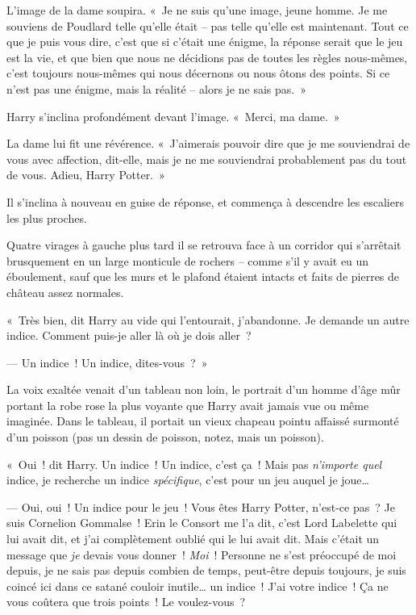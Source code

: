 L'image de la dame soupira.
«~Je ne suis qu'une image, jeune homme.
Je me souviens de Poudlard telle qu'elle était -- pas telle qu'elle est maintenant.
Tout ce que je puis vous dire, c'est que si c'était une énigme, la réponse serait que le jeu est la vie, et que bien que nous ne décidions pas de toutes les règles nous-mêmes, c'est toujours nous-mêmes qui nous décernons ou nous ôtons des points.
Si ce n'est pas une énigme, mais la réalité -- alors je ne sais pas.~»

Harry s'inclina profondément devant l'image. «~Merci, ma dame.~»

La dame lui fit une révérence. «~J'aimerais pouvoir dire que je me souviendrai de vous avec affection, dit-elle, mais je ne me souviendrai probablement pas du tout de vous. Adieu, Harry Potter.~»

Il s'inclina à nouveau en guise de réponse, et commença à descendre les escaliers les plus proches.

Quatre virages à gauche plus tard il se retrouva face à un corridor qui s'arrêtait brusquement en un large monticule de rochers -- comme s'il y avait eu un éboulement, sauf que les murs et le plafond étaient intacts et faits de pierres de château assez normales.

«~Très bien, dit Harry au vide qui l'entourait, j'abandonne.
Je demande un autre indice.
Comment puis-je aller là où je dois aller~?

--- Un indice~! Un indice, dites-vous~?~»

La voix exaltée venait d'un tableau non loin, le portrait d'un homme d'âge mûr portant la robe rose la plus voyante que Harry avait jamais vue ou même imaginée.
Dans le tableau, il portait un vieux chapeau pointu affaissé surmonté d'un poisson (pas un dessin de poisson, notez, mais un poisson).

«~Oui~! dit Harry. Un indice~! Un indice, c'est ça~! Mais pas \emph{n'importe quel} indice, je recherche un indice \emph{spécifique}, c'est pour un jeu auquel je joue…

--- Oui, oui~! Un indice pour le jeu~! Vous êtes Harry Potter, n'est-ce pas~? Je suis Cornelion Gommalse~!
Erin le Consort me l'a dit, c’est Lord Labelette qui lui avait dit, et j’ai complètement oublié qui le lui avait dit.
Mais c'était un message que \emph{je} devais vous donner~!
\emph{Moi}~! Personne ne s'est préoccupé de moi depuis, je ne sais pas depuis combien de temps, peut-être depuis toujours, je suis coincé ici dans ce satané couloir inutile… un indice~! J'ai votre indice~!
Ça ne vous coûtera que trois points~! Le voulez-vous~?


